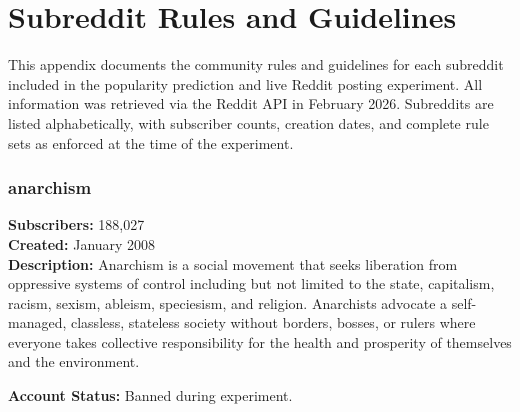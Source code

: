\chapter{Subreddit Rules and Guidelines}
\label{app:subreddit_rules}

This appendix documents the community rules and guidelines for each subreddit included in the popularity prediction and live Reddit posting experiment. All information was retrieved via the Reddit API in February 2026. Subreddits are listed alphabetically, with subscriber counts, creation dates, and complete rule sets as enforced at the time of the experiment.

\subsection{anarchism}
\textbf{Subscribers:} 188,027 \\
\textbf{Created:} January 2008 \\
\textbf{Description:} Anarchism is a social movement that seeks liberation from oppressive systems of control including but not limited to the state, capitalism, racism, sexism, ableism, speciesism, and religion. Anarchists advocate a self-managed, classless, stateless society without borders, bosses, or rulers where everyone takes collective responsibility for the health and prosperity of themselves and the environment.

\textbf{Account Status:} Banned during experiment.

